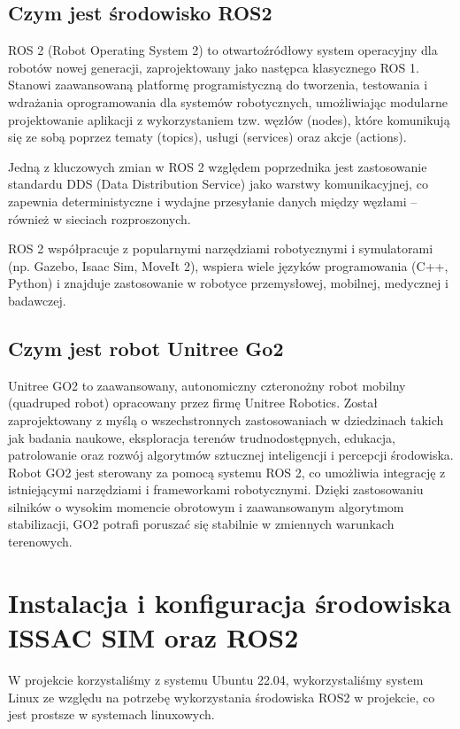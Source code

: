 \documentclass[12pt]{article}
\begin{document}
\subsection{Czym jest środowisko ROS2}

ROS 2 (Robot Operating System 2) to otwartoźródłowy system operacyjny dla robotów nowej generacji, zaprojektowany jako następca klasycznego ROS 1. Stanowi zaawansowaną platformę programistyczną do tworzenia, testowania i wdrażania oprogramowania dla systemów robotycznych, umożliwiając modularne projektowanie aplikacji z wykorzystaniem tzw. węzłów (nodes), które komunikują się ze sobą poprzez tematy (topics), usługi (services) oraz akcje (actions).


Jedną z kluczowych zmian w ROS 2 względem poprzednika jest zastosowanie standardu DDS (Data Distribution Service) jako warstwy komunikacyjnej, co zapewnia deterministyczne i wydajne przesyłanie danych między węzłami – również w sieciach rozproszonych.

ROS 2 współpracuje z popularnymi narzędziami robotycznymi i symulatorami (np. Gazebo, Isaac Sim, MoveIt 2), wspiera wiele języków programowania (C++, Python) i znajduje zastosowanie w robotyce przemysłowej, mobilnej, medycznej i badawczej.

\subsection{Czym jest robot Unitree Go2}

Unitree GO2 to zaawansowany, autonomiczny czteronożny robot mobilny (quadruped robot) opracowany przez firmę Unitree Robotics. Został zaprojektowany z myślą o wszechstronnych zastosowaniach w dziedzinach takich jak badania naukowe, eksploracja terenów trudnodostępnych, edukacja, patrolowanie oraz rozwój algorytmów sztucznej inteligencji i percepcji środowiska.
Robot GO2 jest sterowany za pomocą systemu ROS 2, co umożliwia integrację z istniejącymi narzędziami i frameworkami robotycznymi. Dzięki zastosowaniu silników o wysokim momencie obrotowym i zaawansowanym algorytmom stabilizacji, GO2 potrafi poruszać się stabilnie w zmiennych warunkach terenowych.


\section{Instalacja i konfiguracja środowiska ISSAC SIM oraz ROS2}

W projekcie korzystaliśmy z systemu Ubuntu 22.04, wykorzystaliśmy system Linux ze względu na potrzebę wykorzystania środowiska ROS2 w projekcie, co jest prostsze w systemach linuxowych.   
\end{document}

